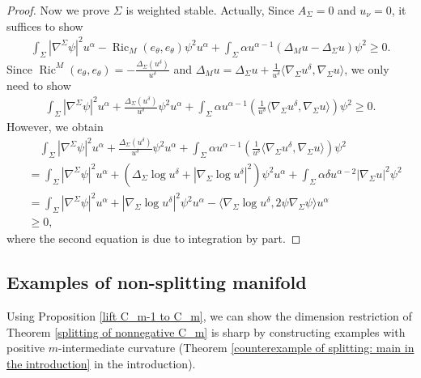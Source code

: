 \documentclass[11pt,letterpaper]{amsart}
\DeclareMathOperator{\Ric}{Ric}
\theoremstyle{definition}
\theoremstyle{remark}
\numberwithin{equation}{section}
\begin{document}
\begin{proof}
Now we prove $\Sigma$ is weighted stable. Actually, Since $A_{\Sigma}=0$ and $u_{\nu}=0$, it suffices to show
\begin{equation*}
        \begin{split}
            \int_{\Sigma}|\nabla^{\Sigma}\psi|^2 u^{\alpha}-\Ric_M(e_{\theta},e_{\theta})\psi^2 u^{\alpha} +\int_{\Sigma}\alpha u^{\alpha-1}\left(\Delta_M u-\Delta_{\Sigma} u\right)\psi^2\geq 0.
        \end{split}
    \end{equation*}
Since $\Ric^{M}(e_{\theta},e_{\theta} )=-\frac{\Delta_{\Sigma}(u^{\delta})}{u^{\delta}}$ and $\Delta_{M}u=\Delta_{\Sigma}u+\frac{1}{u^{\delta}}\langle \nabla_{\Sigma}u^{\delta},\nabla_{\Sigma}u\rangle$, we only need to show
\begin{equation*}
        \begin{split}
            \int_{\Sigma}|\nabla^{\Sigma}\psi|^2 u^{\alpha}+\frac{\Delta_{\Sigma}(u^{\delta})}{u^{\delta}}\psi^2 u^{\alpha} +\int_{\Sigma}\alpha u^{\alpha-1}\left(\frac{1}{u^{\delta}}\langle \nabla_{\Sigma}u^{\delta},\nabla_{\Sigma}u\rangle\right)\psi^2\geq 0.
        \end{split}
    \end{equation*}
However, we obtain
\begin{equation*}
        \begin{split}
            &\quad\int_{\Sigma}|\nabla^{\Sigma}\psi|^2 u^{\alpha}+\frac{\Delta_{\Sigma}(u^{\delta})}{u^{\delta}}\psi^2 u^{\alpha} +\int_{\Sigma}\alpha u^{\alpha-1}\left(\frac{1}{u^{\delta}}\langle \nabla_{\Sigma}u^{\delta},\nabla_{\Sigma}u\rangle\right)\psi^2\\
            &=\int_{\Sigma}|\nabla^{\Sigma}\psi|^2 u^{\alpha}+\left(\Delta_{\Sigma}\log u^{\delta}+|\nabla_{\Sigma}\log u^{\delta}|^2\right)\psi^2 u^{\alpha} +\int_{\Sigma}\alpha\delta u^{\alpha-2}|\nabla_{\Sigma}u|^2\psi^2\\
            &=\int_{\Sigma}|\nabla^{\Sigma}\psi|^2 u^{\alpha}+|\nabla_{\Sigma}\log u^{\delta}|^2\psi^2 u^{\alpha} -\langle \nabla_{\Sigma}\log u^{\delta},2\psi\nabla_{\Sigma}\psi\rangle u^{\alpha}\\
            &\geq 0,
        \end{split}
    \end{equation*}
    where the second equation is due to integration by part.
\end{proof}

\subsection{Examples of non-splitting manifold}
Using Proposition \ref{lift C_m-1 to C_m}, we can show the dimension restriction of Theorem \ref{splitting of nonnegative C_m} is sharp by constructing examples with positive $m$-intermediate curvature (Theorem \ref{counterexample of splitting: main in the introduction} in the introduction).
\end{document}
